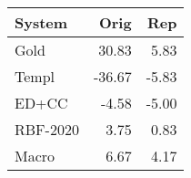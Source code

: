 \begin{tabular}{lrr}
\toprule
System & Orig & Rep \\
\midrule
Gold & 30.83 & 5.83 \\
Templ & -36.67 & -5.83 \\
ED+CC & -4.58 & -5.00 \\
RBF-2020 & 3.75 & 0.83 \\
Macro & 6.67 & 4.17 \\
\bottomrule
\end{tabular}
